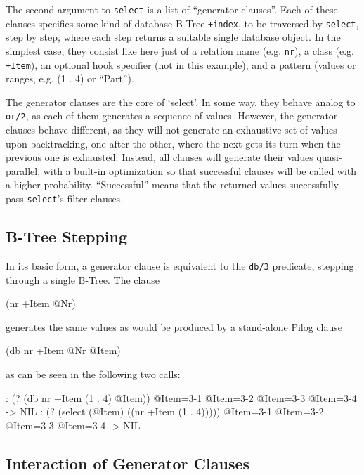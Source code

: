 The second argument to \texttt{select} is a list of ``generator clauses''. Each
of these clauses specifies some kind of database B-Tree \texttt{+index}, to be
traversed by \texttt{select}, step by step, where each step returns a suitable
single database object. In the simplest case, they consist like here
just of a relation name (e.g. \texttt{nr}), a class (e.g. \texttt{+Item}), an optional
hook specifier (not in this example), and a pattern (values or ranges,
e.g. (1 . 4) or ``Part'').

The generator clauses are the core of `select'. In some way, they behave
analog to \texttt{or/2}, as each of them generates a sequence of values.
However, the generator clauses behave different, as they will not
generate an exhaustive set of values upon backtracking, one after the
other, where the next gets its turn when the previous one is exhausted.
Instead, all clauses will generate their values quasi-parallel, with a
built-in optimization so that successful clauses will be called with a
higher probability. ``Successful'' means that the returned values
successfully pass \texttt{select}'s filter clauses.

 
\subsection{B-Tree Stepping}
\label{sec:select-pred-b-tree-stepping}


In its basic form, a generator clause is equivalent to the \texttt{db/3}
predicate, stepping through a single B-Tree. The clause


\begin{wideverbatim}
(nr +Item @Nr)
\end{wideverbatim}

generates the same values as would be produced by a stand-alone Pilog
clause


\begin{wideverbatim}
(db nr +Item @Nr @Item)
\end{wideverbatim}

as can be seen in the following two calls:


\begin{wideverbatim}
: (? (db nr +Item (1 . 4) @Item))
 @Item={3-1}
 @Item={3-2}
 @Item={3-3}
 @Item={3-4}
-> NIL
: (? (select (@Item) ((nr +Item (1 . 4)))))
 @Item={3-1}
 @Item={3-2}
 @Item={3-3}
 @Item={3-4}
-> NIL
\end{wideverbatim}

 
\subsection{Interaction of Generator Clauses}
\label{sec:select-pred-interaction-of-generator-clauses}


